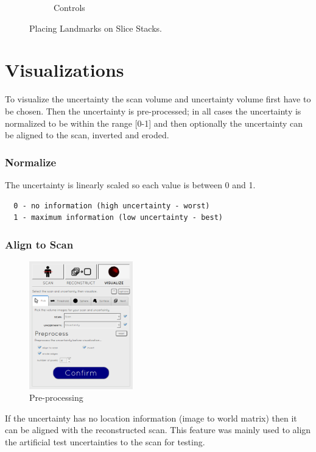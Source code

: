 \begin{figure}[H]
\begin{subfigure}[b]{0.441\textwidth}
    \caption*{Controls}
    \label{fig:reconstructioncontrols}
  \end{subfigure}
  \caption{Placing Landmarks on Slice Stacks.}\label{fig:reconstructionlandmarks}
\end{figure}

\clearpage
\section{Visualizations}\label{implementation:visualizations}
To visualize the uncertainty the scan volume and uncertainty volume first have to be chosen. Then the uncertainty is pre-processed; in all cases the uncertainty is normalized to be within the range [0-1] and then optionally the uncertainty can be aligned to the scan, inverted and eroded.

\subsubsection*{Normalize}
The uncertainty is linearly scaled so each value is between 0 and 1.

\begin{verbatim}
  0 - no information (high uncertainty - worst)
  1 - maximum information (low uncertainty - best)
\end{verbatim}

\subsubsection*{Align to Scan}
\begin{figure}
  \vspace{-20pt}
  \includegraphics[width=0.4\textwidth]{images/pre-processing.png}
  \caption{Pre-processing}\label{fig:scansettings}
\end{figure}

If the uncertainty has no location information (image to world matrix) then it can be aligned with the reconstructed scan. This feature was mainly used to align the artificial test uncertainties to the scan for testing.

